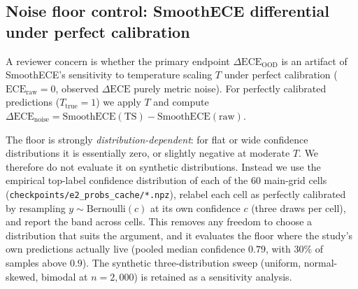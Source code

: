\documentclass[review,12pt,nonatbib]{elsarticle}
\begin{document}
\subsection{Noise floor control: SmoothECE differential under perfect calibration}
\label{sec:noise_floor}
A reviewer concern is whether the primary endpoint
$\Delta\text{ECE}_{\text{OOD}}$ is an artifact of SmoothECE's
sensitivity to temperature scaling $T$ under perfect calibration
($\text{ECE}_{\text{raw}} = 0$, observed $\Delta\text{ECE}$ purely
metric noise). For perfectly calibrated predictions
($T_{\text{true}}=1$) we apply $T$ and compute
$\Delta\text{ECE}_{\text{noise}} = \text{SmoothECE}(\text{TS}) - \text{SmoothECE}(\text{raw})$.

The floor is strongly \emph{distribution-dependent}: for flat or wide
confidence distributions it is essentially zero, or slightly negative at
moderate $T$. We therefore do not evaluate it on synthetic
distributions. Instead we use the empirical top-label confidence
distribution of each of the 60 main-grid cells
(\texttt{checkpoints/e2\_probs\_cache/*.npz}), relabel each cell as
perfectly calibrated by resampling $y \sim \mathrm{Bernoulli}(c)$ at its
own confidence $c$ (three draws per cell), and report the band across
cells. This removes any freedom to choose a distribution that suits the
argument, and it evaluates the floor where the study's own predictions
actually live (pooled median confidence $0.79$, with $30\%$ of samples
above $0.9$). The synthetic three-distribution sweep (uniform,
normal-skewed, bimodal at $n=2{,}000$) is retained as a sensitivity
analysis.
\end{document}
